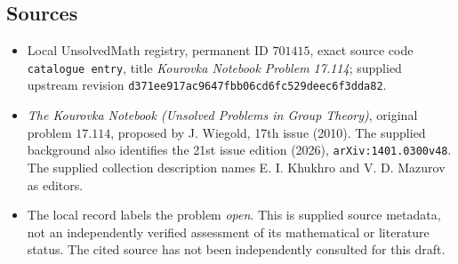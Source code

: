 \documentclass[11pt]{article}
\begin{document}
\subsection{Sources}
\begin{itemize}
\item Local UnsolvedMath registry, permanent ID \(701415\), exact source code \texttt{catalogue entry}, title \emph{Kourovka Notebook Problem 17.114}; supplied upstream revision \texttt{d371ee917ac9647fbb06cd6fc529deec6f3dda82}.
\item \emph{The Kourovka Notebook (Unsolved Problems in Group Theory)}, original problem \(17.114\), proposed by J. Wiegold, 17th issue (2010). The supplied background also identifies the 21st issue edition (2026), \texttt{arXiv:1401.0300v48}. The supplied collection description names E. I. Khukhro and V. D. Mazurov as editors.
\item The local record labels the problem \emph{open}. This is supplied source metadata, not an independently verified assessment of its mathematical or literature status. The cited source has not been independently consulted for this draft.
\end{itemize}
\end{document}
